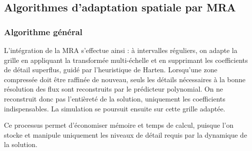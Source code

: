 \subsection{Algorithmes d'adaptation spatiale par MRA}

\subsubsection{Algorithme général}
L'intégration de la MRA s'effectue ainsi : à intervalles réguliers, on adapte la grille en appliquant la transformée multi-échelle et en supprimant les coefficients de détail superflus, guidé par l'heuristique de Harten. 
Lorsqu'une zone compressée doit être raffinée de nouveau, seuls les détails nécessaires à la bonne résolution des flux sont reconstruits par le prédicteur polynomial. 
On ne reconstruit donc pas l'entièreté de la solution, uniquement les coefficients indispensables. La simulation se poursuit ensuite sur cette grille adaptée.

Ce processus permet d'économiser mémoire et temps de calcul, puisque l'on stocke et manipule uniquement les niveaux de détail requis par la dynamique de la solution.

